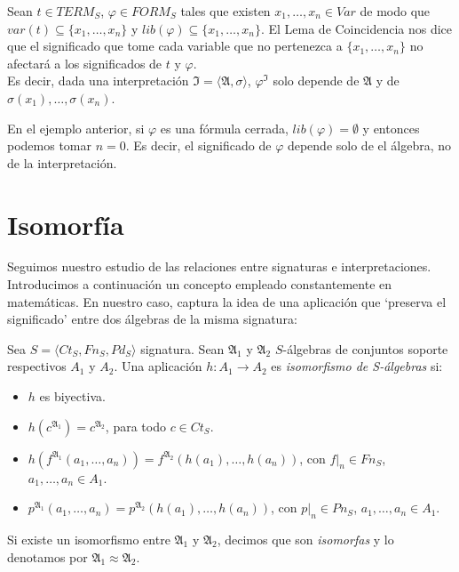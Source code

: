 \begin{example}
Sean $t \in TERM_S$, $\varphi \in FORM_S$ tales que existen $x_1, \dots, x_n \in Var$ de modo que $var(t) \subseteq \{x_1, \dots, x_n\}$ y $lib(\varphi) \subseteq \{x_1, \dots, x_n\}$. El Lema de Coincidencia nos dice que el significado que tome cada variable que no pertenezca a $\{x_1, \dots, x_n \}$ no afectará a los significados de $t$ y $\varphi$.\\
Es decir, dada una interpretación $\mathfrak{I}=\langle \mathfrak{A}, \sigma \rangle$, $\varphi^\mathfrak{I}$ solo depende de $\mathfrak{A}$ y de $\sigma(x_1),\dots,\sigma(x_n)$.
\end{example}

\begin{example}
En el ejemplo anterior, si $\varphi$ es una fórmula cerrada, $lib(\varphi) = \emptyset$ y entonces podemos tomar $n=0$. Es decir, el significado de $\varphi$ depende solo de el álgebra, no de la interpretación.
\end{example}


\section{Isomorfía}

Seguimos nuestro estudio de las relaciones entre signaturas e interpretaciones. Introducimos a continuación un concepto empleado constantemente en matemáticas. En nuestro caso, captura la idea de una aplicación que `preserva el significado' entre dos álgebras de la misma signatura:

\begin{definition}
Sea $S = \langle Ct_{S}, Fn_{S}, Pd_{S}\rangle$ signatura. Sean $\mathfrak{A}_1$ y $\mathfrak{A}_2$ $S$-álgebras de conjuntos soporte respectivos $A_1$ y $A_2$. Una aplicación $h: A_1 \rightarrow A_2$ es \textit{isomorfismo de S-álgebras} si:
\begin{itemize}
    \item $h$ es biyectiva.
    \item $h(c^{\mathfrak{A}_1}) = c^{\mathfrak{A}_2}$, para todo $c \in Ct_S$.
    \item $h(f^{\mathfrak{A}_1}(a_1, \dots, a_n)) = f^{\mathfrak{A}_2}(h(a_1), \dots, h(a_n))$, con $f|_n \in Fn_S$, $a_1, \dots, a_n \in A_1$.
    \item $p^{\mathfrak{A}_1}(a_1, \dots, a_n) = p^{\mathfrak{A}_2}(h(a_1), \dots, h(a_n))$, con $p|_n \in Pn_S$, $a_1, \dots, a_n \in A_1$.
\end{itemize}
Si existe un isomorfismo entre $\mathfrak{A}_1$ y $\mathfrak{A}_2$, decimos que son \textit{isomorfas} y lo denotamos por $\mathfrak{A}_1 \approx \mathfrak{A}_2$.
\end{definition}

